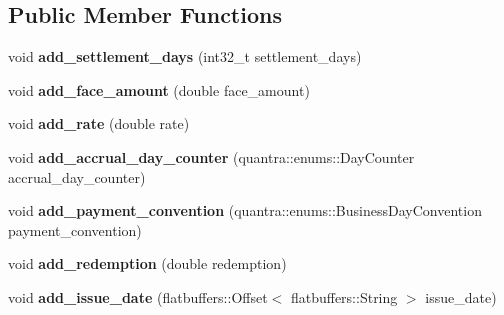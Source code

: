 \subsection*{Public Member Functions}
\begin{DoxyCompactItemize}
\item 
\mbox{\label{structquantra_1_1FixedRateBondBuilder_a3bdd118d88c2a294ce8655461a4500d7}} 
void {\bfseries add\+\_\+settlement\+\_\+days} (int32\+\_\+t settlement\+\_\+days)
\item 
\mbox{\label{structquantra_1_1FixedRateBondBuilder_a90a9c17a2ac5f80133af077b8bc0ca9c}} 
void {\bfseries add\+\_\+face\+\_\+amount} (double face\+\_\+amount)
\item 
\mbox{\label{structquantra_1_1FixedRateBondBuilder_a256195df19101275b478d743e503cf47}} 
void {\bfseries add\+\_\+rate} (double rate)
\item 
\mbox{\label{structquantra_1_1FixedRateBondBuilder_a651f61bf170aa8fae286ede85c1899ce}} 
void {\bfseries add\+\_\+accrual\+\_\+day\+\_\+counter} (quantra\+::enums\+::\+Day\+Counter accrual\+\_\+day\+\_\+counter)
\item 
\mbox{\label{structquantra_1_1FixedRateBondBuilder_a587506dc85a8f121e5699311faaa1141}} 
void {\bfseries add\+\_\+payment\+\_\+convention} (quantra\+::enums\+::\+Business\+Day\+Convention payment\+\_\+convention)
\item 
\mbox{\label{structquantra_1_1FixedRateBondBuilder_a4239cb6bbd722617e527453ec667af66}} 
void {\bfseries add\+\_\+redemption} (double redemption)
\item 
\mbox{\label{structquantra_1_1FixedRateBondBuilder_aeb8c844b0bdb78621e242adf0661a04f}} 
void {\bfseries add\+\_\+issue\+\_\+date} (flatbuffers\+::\+Offset$<$ flatbuffers\+::\+String $>$ issue\+\_\+date)
\item 
\mbox{\label{structquantra_1_1FixedRateBondBuilder_a402f7986fdf6bbfa80a32423d541fb28}} 

\end{DoxyCompactItemize}
